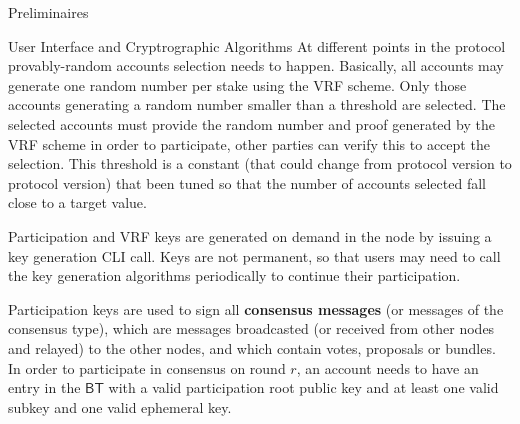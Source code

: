 \documentclass[10pt,a4paper]{article}
\begin{document}
\begin{section}{Preliminaires}
\begin{subsection}{User Interface and Cryptrographic Algorithms}
    At different points in the protocol provably-random accounts selection needs to happen. 
    Basically, all accounts may generate one random number per stake using the VRF scheme.
    Only those accounts generating a random number smaller than a threshold are selected. 
    The selected accounts must provide the random number and proof generated by the VRF 
    scheme in order to participate, other parties can verify this to accept the selection. 
    This threshold is a constant (that could change from protocol version to protocol version) 
    that been tuned so that the number of accounts selected fall close to a target value.

    Participation and VRF keys are generated on demand in the node by issuing a key generation 
    CLI call.
    Keys are not permanent, so that users may need to call the key generation algorithms
    periodically to continue their participation.

    Participation keys are used to sign all {\bf consensus messages} (or messages of the consensus type),
    which are messages broadcasted (or received from other nodes and relayed) to the other nodes, and which 
    contain votes, proposals or bundles.
    In order to participate in consensus on round $r$, an account needs to have an entry in the $\mathsf{BT}$ 
    with a valid participation root public key and at least one valid subkey and one valid ephemeral key.


\end{subsection}
\end{section}
\end{document}
